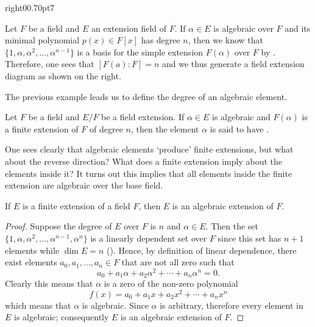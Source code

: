 \begin{examplewithcutout}{right}{0}{0.7\textwidth}{0pt}{7}{
    \begin{figure}[H]
        \centering
    \end{figure}
}
    Let $F$ be a field and $E$ an extension field of $F$. If $\alpha \in E$ is algebraic over $F$ and its minimal polynomial $p(x) \in F[x]$ has degree $n$, then we know that $\{1, \alpha, \alpha^2, \dots, \alpha^{n-1}\}$ is a basis for the simple extension $F(\alpha)$ over $F$ by . Therefore, one sees that $[F(a): F] = n$ and we thus generate a field extension diagram as shown on the right.
\end{examplewithcutout}

The previous example leads us to define the degree of an algebraic element.

\begin{definition}
    Let $F$ be a field and $E/F$ be a field extension. If $\alpha \in E$ is algebraic and $F(\alpha)$ is a finite extension of $F$ of degree $n$, then the element $\alpha$ is said to have .
\end{definition}

One sees clearly that algebraic elements `produce' finite extensions, but what about the reverse direction? What does a finite extension imply about the elements inside it? It turns out this implies that all elements inside the finite extension are algebraic over the base field.

\begin{theorem}\label{thrm-finite-extension-is-algebraic}
    If $E$ is a finite extension of a field $F$, then $E$ is an algebraic extension of $F$.
\end{theorem}
\begin{proof}
    Suppose the degree of $E$ over $F$ is $n$ and $\alpha \in E$. Then the set $\{1, \alpha, \alpha^2, \dots, \alpha^{n-1}, \alpha^n\}$ is a linearly dependent set over $F$ since this set has $n + 1$ elements while $\dim E = n$ (). Hence, by definition of linear dependence, there exist elements $a_0, a_1, \dots, a_n \in F$ that are not all zero such that
    \[
        a_0 + a_1\alpha + a_2\alpha^2 + \cdots + a_n\alpha^n = 0.
    \]
    Clearly this means that $\alpha$ is a zero of the non-zero polynomial
    \[
        f(x) = a_0 + a_1x + a_2x^2 + \cdots + a_nx^n
    \]
    which means that $\alpha$ is algebraic. Since $\alpha$ is arbitrary, therefore every element in $E$ is algebraic; consequently $E$ is an algebraic extension of $F$.
\end{proof}

